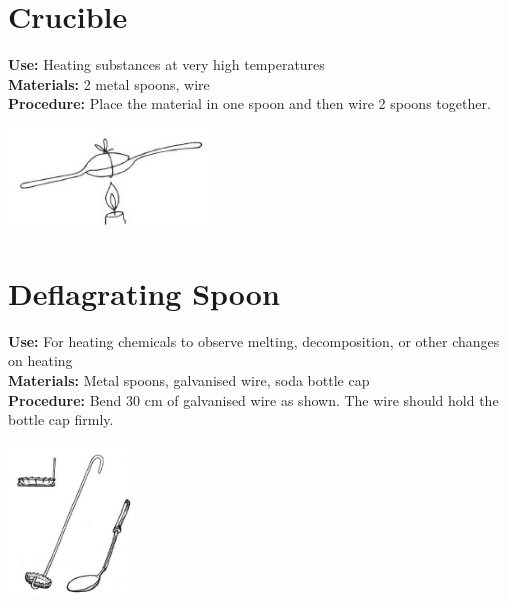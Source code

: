 \begin{multicols}{2}
\section{Crucible} 
\label{sec:crucible}
\vspace{-10pt}
\textbf{Use:} Heating substances at very high temperatures\\
\textbf{Materials:} 2 metal spoons, wire\\
\textbf{Procedure:} Place the material in one spoon and then wire 2 spoons together.
\begin{center}
\includegraphics[width=0.4\textwidth]{./img/vso/crucible.jpg}
\end{center}

\columnbreak

\section{Deflagrating Spoon} 
\label{sec:deflagratingspoon}
\vspace{-10pt}
\textbf{Use:} For heating chemicals to observe melting, decomposition, or other changes on heating\\
\textbf{Materials:} Metal spoons, galvanised wire, soda bottle cap\\
\textbf{Procedure:} Bend 30 cm of galvanised wire as shown. The wire should hold the bottle cap firmly.
\begin{center}
\includegraphics[width=0.25\textwidth]{./img/source/deflagrating-spoon.jpg}
\end{center}


\end{multicols}
